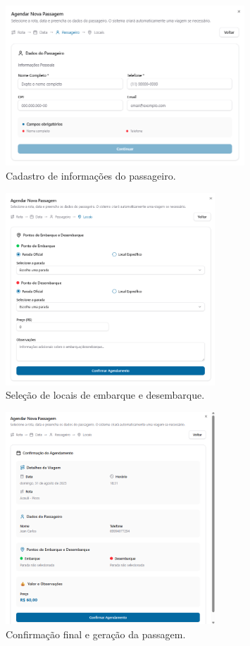 \begin{figure}[H]
 \centering
 \includegraphics[width=0.8\textwidth]{imagens/wizard-passageiro.png}
 \caption{Cadastro de informações do passageiro.}
 \label{fig:wizard-passageiro}
\end{figure}

\begin{figure}[H]
 \centering
 \includegraphics[width=0.7\textwidth]{imagens/wizard-locais.png}
 \caption{Seleção de locais de embarque e desembarque.}
 \label{fig:wizard-locais}
\end{figure}

\begin{figure}[H]
 \centering
 \includegraphics[width=0.7\textwidth]{imagens/wizard-confirmacao.png}
 \caption{Confirmação final e geração da passagem.}
 \label{fig:wizard-confirmacao}
\end{figure}